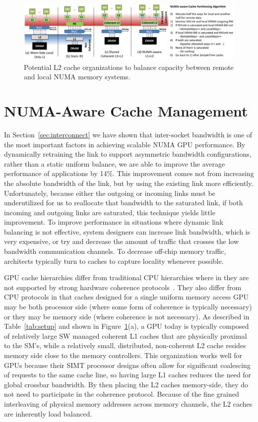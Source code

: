 \begin{figure}[t]
    \centering
    \includegraphics[width=1.0\textwidth]{figures/cache_configurations_static_dynamic.pdf}
    \caption{Potential L2 cache organizations to balance capacity between remote and
    local NUMA memory systems.}
    \label{fig:cacheorg}
\end{figure}

\section{NUMA-Aware Cache Management}
\label{caching}
In Section~\ref{sec:interconnect} we have shown that inter-socket bandwidth is one
of the most important factors in achieving scalable NUMA GPU performance. By
dynamically retraining the link to support asymmetric bandwidth configurations,
rather than a static uniform balance, we are able to improve the average performance
of applications by 14\%.  This improvement comes not from increasing the
absolute bandwidth of the link, but by using the existing link more efficiently.
Unfortunately, because either the outgoing or incoming links must be underutilized
for us to reallocate that bandwidth to the saturated link, if both incoming and
outgoing links are saturated, this technique yields little improvement.
To improve performance in situations where dynamic link balancing is not effective,
system designers can increase link bandwidth, which is very expensive,
or try and decrease the amount of traffic that crosses the low bandwidth
communication channels.  To decrease off-chip memory traffic, architects typically
turn to caches to capture locality whenever possible.

GPU cache hierarchies differ from traditional CPU hierarchies where in they 
are not supported by strong hardware coherence protocols~\cite{Singh2013}. 
They also differ from CPU protocols in that caches designed for a single 
uniform memory access GPU may be both processor side (where some form of 
coherence is typically necessary) or they may be memory side (where coherence 
is not necessary).  As described in Table~\ref{tab:setup} and shown in 
Figure~\ref{fig:cacheorg}(a), a GPU today is typically composed of relatively 
large SW managed coherent L1 caches that are physically proximal to the SM's, 
while a relatively small, distributed, non-coherent L2 cache resides memory 
side close to the memory controllers.  This organization works well for GPUs 
because their SIMT processor designs often allow for significant coalescing 
of requests to the same cache line, so having large L1 caches reduces the 
need for global crossbar bandwidth.  By then placing the L2 caches 
memory-side, they do not need to participate in the coherence protocol.  
Because of the fine grained interleaving of physical memory addresses across 
memory channels, the L2 caches are inherently load balanced.

